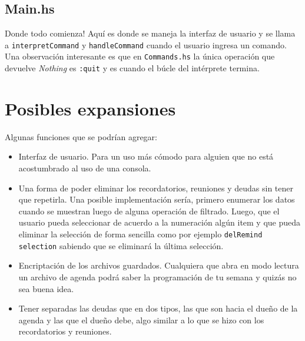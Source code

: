 \documentclass[a4paper,12pt]{article}
\begin{document}
        \subsection*{Main.hs}
        Donde todo comienza! Aquí es donde se maneja la interfaz de usuario y se llama a \texttt{interpretCommand} y \texttt{handleCommand} cuando el usuario ingresa un comando. \\
        Una observación interesante es que en \texttt{Commands.hs} la única operación que devuelve \textit{Nothing} es \texttt{:quit} y es cuando el búcle del intérprete termina.

    \section*{Posibles expansiones}
      Algunas funciones que se podrían agregar: %

      \begin{itemize}
        \item Interfaz de usuario. Para un uso más cómodo para alguien que no está acostumbrado al uso de una consola.
        \item Una forma de poder eliminar los recordatorios, reuniones y deudas sin tener que repetirla. Una posible implementación sería, primero enumerar los datos cuando se muestran luego de alguna operación de filtrado. Luego, que el usuario pueda seleccionar de acuerdo a la numeración algún item y que pueda eliminar la selección de forma sencilla como por ejemplo \texttt{delRemind selection} sabiendo que se eliminará la última selección.
        \item Encriptación de los archivos guardados. Cualquiera que abra en modo lectura un archivo de agenda podrá saber la programación de tu semana y quizás no sea buena idea.
        \item Tener separadas las deudas que en dos tipos, las que son hacia el dueño de la agenda y las que el dueño debe, algo similar a lo que se hizo con los recordatorios y reuniones.
      \end{itemize}
\end{document}
